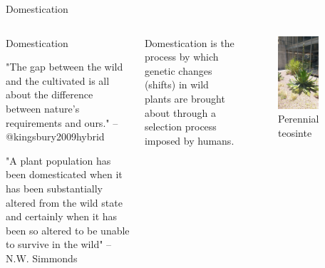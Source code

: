 \documentclass[11pt,ignorenonframetext,aspectratio=169]{beamer}
\begin{document}
\begin{frame}{Domestication}
\protect\hypertarget{domestication-1}{}
\begin{columns}[T,onlytextwidth]

  \begin{block}{Domestication}

"The gap between the wild and the cultivated is all about the difference between nature's requirements and ours." -- @kingsbury2009hybrid

"A plant population has been domesticated when it has been substantially altered from the wild state and certainly when it has been so altered to be unable to survive in the wild" -- N.W. Simmonds
  \end{block}

Domestication is the process by which genetic changes (shifts) in wild plants are brought about through a selection process imposed by humans.


\begin{figure}

{\centering \includegraphics[width=0.7\textwidth, keepaspectratio,height=0.92\textheight]{./images/Perennial_teosinte} 

}

\caption{Perennial teosinte}\label{fig:weed-vs-crop}
\end{figure}

\end{columns}
\end{frame}
\end{document}
